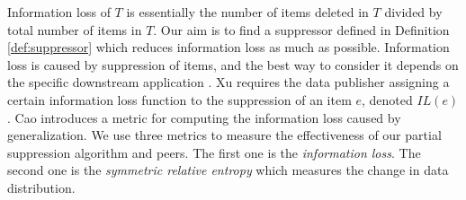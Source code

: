 Information loss of $T$ is essentially the number of items deleted in $T$
divided by total number of items in $T$. Our aim is to find a suppressor
defined in Definition \ref{def:suppressor} which reduces information loss as
much as possible. Information loss is caused by suppression of items, and the
best way to consider it depends on the specific downstream application
\cite{Xu:2008:ATD}. Xu \etal \cite{Xu:2008:ATD} requires the data publisher
assigning a certain information loss function to the suppression of an item
$e$, denoted $IL(e)$.
Cao \etal
\cite{Cao:2010:rho} introduces a metric for computing the information loss
caused by generalization.
We use three metrics to measure the effectiveness of our partial suppression
algorithm and peers. The first one is the \emph{information loss}. The second
one is the \emph{symmetric relative entropy} which measures the change in
data distribution. 


